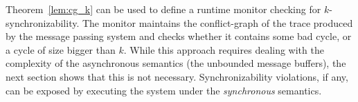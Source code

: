 Theorem~\ref{lem:cg_k} can be used to define a runtime monitor checking for $k$-synchronizability. 
The monitor maintains the conflict-graph of the trace produced by the message passing system and checks whether it contains some bad cycle, or a cycle of size bigger than $k$.
While this approach requires dealing with the complexity of the asynchronous semantics (the unbounded message buffers), the next section shows that this is not necessary. Synchronizability violations, if any, can be exposed by executing the system under the \emph{synchronous} semantics.


